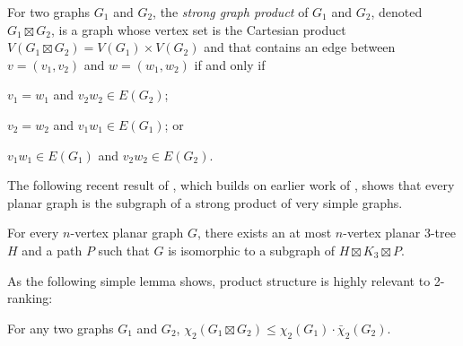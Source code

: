 \documentclass[kpfonts]{patmorin}
\newcommand{\trn}{\chi_2}
\newcommand{\dtcn}{\bar{\chi}_2}
\theoremstyle{named}
\begin{document}
For two graphs $G_1$ and $G_2$, the \emph{strong graph product} of $G_1$ and $G_2$, denoted $G_1\boxtimes G_2$, is a graph whose vertex set is the Cartesian product $V(G_1\boxtimes G_2)= V(G_1)\times V(G_2)$ and that contains an edge between $v=(v_1,v_2)$ and $w=(w_1,w_2)$ if and only if
\begin{inparaenum}[(i)]
    \item $v_1=w_1$ and $v_2w_2\in E(G_2)$;
    \item $v_2=w_2$ and $v_1w_1\in E(G_1)$; or
    \item $v_1w_1\in E(G_1)$ and $v_2w_2\in E(G_2)$.
\end{inparaenum}

The following recent result of \citet{dujmovic.joret.ea:planar}, which builds on earlier work of \citet{pilipczuk.siebertz:polynomial}, shows that every planar graph is the subgraph of a strong product of very simple graphs.

\begin{thm}\cite{dujmovic.joret.ea:planar}\label{product-structure}
    For every $n$-vertex planar graph $G$, there exists an at most $n$-vertex planar 3-tree $H$ and a path $P$ such that $G$ is isomorphic to a subgraph of $H\boxtimes K_3\boxtimes P$.
\end{thm}

As the following simple lemma shows, product structure is highly relevant to 2-ranking:

\begin{lem}\label{product-lemma}
    For any two graphs $G_1$ and $G_2$, $\trn(G_1\boxtimes G_2)\le \trn(G_1)\cdot\dtcn(G_2)$.
\end{lem}
\end{document}
